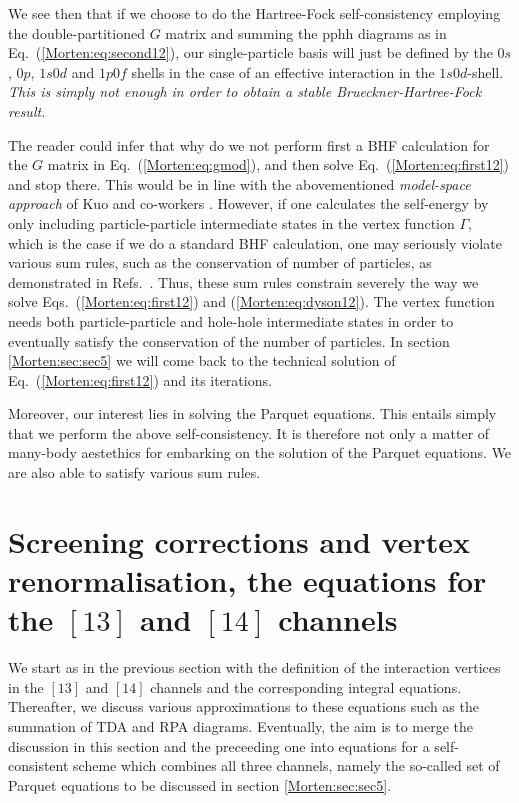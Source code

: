 We see then that if we choose to do 
the Hartree-Fock self-consistency
employing the double-partitioned $G$ matrix and summing
the pphh diagrams as in Eq.~(\ref{Morten:eq:second12}), 
our single-particle basis will just be
defined by the $0s$, $0p$, $1s0d$ and $1p0f$ shells in the case
of an effective interaction in the $1s0d$-shell. 
{\em This is simply
not enough in order to obtain a stable Brueckner-Hartree-Fock
result.}  

The reader could infer that why do we not perform first a BHF
calculation for the $G$ matrix in Eq.~(\ref{Morten:eq:gmod}), and then
solve Eq.~(\ref{Morten:eq:first12}) and stop there.  This would be in
line with the abovementioned {\em model-space approach} of Kuo and
co-workers \cite{Morten:kt94}.  However, if one calculates the
self-energy by only including particle-particle intermediate states in
the vertex function $\Gamma$, which is the case if we do a standard
BHF calculation, one may seriously violate various sum rules,
such as the conservation of number of particles, as
demonstrated in Refs.~\cite{Morten:ms92,Morten:mahaux85}.  Thus, these
sum rules 
constrain severely the way we solve Eqs.~(\ref{Morten:eq:first12})
and (\ref{Morten:eq:dyson12}).  The vertex function needs both
particle-particle and hole-hole intermediate states in order to
eventually satisfy  the conservation of the number of particles.
In section \ref{Morten:sec:sec5} we will come back to the
technical solution of Eq.~(\ref{Morten:eq:first12}) and its
iterations. 


Moreover, our interest lies in solving
the Parquet equations. This
entails simply that we perform the above
self-consistency. 
It is therefore not only a matter of many-body aestethics for
embarking on the solution of the Parquet equations.
We are also able to satisfy various sum rules.

\section[Screening corrections and vertex renormalisation]{Screening corrections and vertex renormalisation, the equations
for the $[13]$ and $[14]$ channels}
\label{Morten:sec:sec4}

We start as in the previous section with the definition of the interaction
vertices in the $[13]$ and $[14]$ channels and the corresponding
integral equations. Thereafter, we discuss various approximations
to these equations such as the summation of TDA and RPA diagrams.
 
Eventually, the aim is to merge the discussion in this section and 
the preceeding one into equations for a self-consistent scheme which combines 
all three channels, namely the so-called set of Parquet equations to
be discussed in section \ref{Morten:sec:sec5}. 

